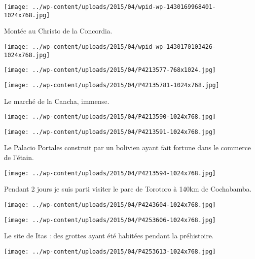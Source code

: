  \newline
 \newline
\centerline{\texttt{[image: ../wp-content/uploads/2015/04/wpid-wp-1430169968401-1024x768.jpg]} } 
 \newline
 Montée au Christo de la Concordia. \newline
 \newline
\centerline{\texttt{[image: ../wp-content/uploads/2015/04/wpid-wp-1430170103426-1024x768.jpg]} } 
 \newline
 \newline
\centerline{\texttt{[image: ../wp-content/uploads/2015/04/P4213577-768x1024.jpg]} } 
 \newline
 \newline
\centerline{\texttt{[image: ../wp-content/uploads/2015/04/P42135781-1024x768.jpg]} } 
 \newline
 Le marché de la Cancha, immense. \newline
 \newline
\centerline{\texttt{[image: ../wp-content/uploads/2015/04/P4213590-1024x768.jpg]} } 
 \newline
 \newline
\centerline{\texttt{[image: ../wp-content/uploads/2015/04/P4213591-1024x768.jpg]} } 
 \newline
 Le Palacio Portales construit par un bolivien ayant fait fortune dans le commerce de l'étain. \newline
 \newline
\centerline{\texttt{[image: ../wp-content/uploads/2015/04/P4213594-1024x768.jpg]} } 
 \newline
 Pendant 2 jours je suis parti visiter le parc de Torotoro à 140km de Cochabamba. \newline
 \newline
\centerline{\texttt{[image: ../wp-content/uploads/2015/04/P4243604-1024x768.jpg]} } 
 \newline
 \newline
\centerline{\texttt{[image: ../wp-content/uploads/2015/04/P4253606-1024x768.jpg]} } 
 \newline
 Le site de Itas : des grottes ayant été habitées pendant la préhistoire. \newline
 \newline
\centerline{\texttt{[image: ../wp-content/uploads/2015/04/P4253613-1024x768.jpg]} } 
